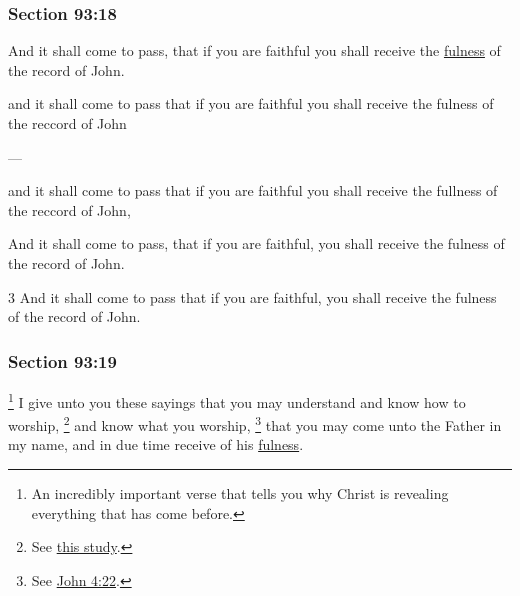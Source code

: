 	\subsubsection{Section 93:18} %
		\label{DC93-18}

		And it shall come to pass, that if you are faithful you shall receive the \hyperref[FULNESS]{fulness} of the record of John.

		\begin{framed}
		\scriptsize
			\begin{compactdesc}
				\item[JSP] and it shall come to pass that if you are faithful you shall receive the fulness of the reccord of John
				\item[BC] ---
				\item[RB2] and it shall come to pass that if you are faithful you shall receive the fullness of the reccord of John,
				\item[RB1] And it shall come to pass, that if you are faithful, you shall receive the fulness of the record of John. 
				\item[DC 1835] 3 And it shall come to pass that if you are faithful, you shall receive the fulness of the record of John. 
			\end{compactdesc}
		\end{framed}

	\subsubsection{Section 93:19} %
		\label{DC93-19}

			\footnote{%
				An incredibly important verse that tells you why Christ is revealing everything that has come before.
				}%
		I give unto you these sayings that you may understand and know how to worship,%
			\footnote{%
				See \hyperref[REPENTANCE-learning]{this study}.
				}
		and know what you worship,%
			\footnote{%
				See \hyperref[JOHN-4-22]{John 4:22}.
				}
		that you may come unto the Father in my name, and in due time receive of his \hyperref[FULNESS]{fulness}.

